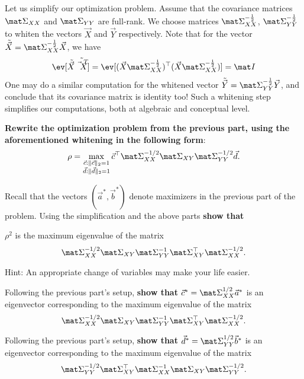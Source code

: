 \documentclass[preview]{standalone}
\begin{document}
\begin{Parts}
\Part Let us simplify our optimization problem. Assume that the covariance matrices
$\mat \Sigma_{XX}$ and $\mat \Sigma_{YY}$ are full-rank.
We choose matrices $\mat \Sigma_{XX}^{-\frac{1}{2}}$,
$\mat \Sigma_{YY}^{-\frac{1}{2}}$ to whiten the vectors $\vec X$ and $\vec Y$ respectively.
Note that for the vector $\tilde{\vec X} = \mat \Sigma_{XX}^{-\frac{1}{2}} \vec X$, we have
\begin{align*}
  \ev[\tilde{\vec X} \tilde{\vec X^T} ]
  = \ev[(\vec X\mat \Sigma_{XX}^{-\frac{1}{2}})^\top(\vec X\mat \Sigma_{XX}^{-\frac{1}{2}})]
  = \mat I
\end{align*}
One may do a similar computation for the whitened vector $\tilde{\vec Y} = \mat \Sigma_{YY}^{-\frac{1}{2}} \vec Y$, and conclude that its covariance matrix is identity too!
Such a whitening step simplifies our computations, both at algebraic and conceptual level.

{\bf Rewrite the optimization problem from the previous part, using the aforementioned
whitening in the following form}:
\begin{align*}
\rho = \max_{\substack{\vec{c} : \|\vec{c}\|_2 = 1 \\ \vec{d}: \|\vec{d}\|_2 = 1 }}
\vec{c}^\top \mat \Sigma_{XX}^{-1/2}\mat \Sigma_{XY} \mat \Sigma_{YY}^{-1/2} \vec{d}.
\end{align*}



\Part Recall that the vectors $(\vec{a}^*, \vec{b}^*)$ denote maximizers in the previous part of the problem.
Using the simplification and the above parts {\bf show that}

$\rho^2$ is the maximum eigenvalue of the matrix
$$\mat \Sigma_{XX}^{-1/2} \mat \Sigma_{XY} \mat \Sigma_{YY}^{-1} \mat \Sigma_{XY}^\top \mat \Sigma_{XX}^{-1/2}.$$

Hint: An appropriate change of variables may make your life easier.



\Part Following the previous part's setup, {\bf show that}
$\vec{c}^* = \mat \Sigma_{XX}^{1/2} \vec{a}^*$ is an eigenvector
corresponding to the maximum eigenvalue of the matrix
$$\mat \Sigma_{XX}^{-1/2} \mat \Sigma_{XY} \mat \Sigma_{YY}^{-1} \mat \Sigma_{XY}^\top \mat \Sigma_{XX}^{-1/2}.$$



\Part Following the previous part's setup, {\bf show that}
$\vec{d}^* = \mat \Sigma_{YY}^{1/2} \vec{b}^*$ is an eigenvector
corresponding to the maximum eigenvalue of the matrix
$$\mat \Sigma_{YY}^{-1/2} \mat \Sigma_{XY}^\top \mat \Sigma_{XX}^{-1} \mat \Sigma_{XY} \mat \Sigma_{YY}^{-1/2}.$$





\end{Parts}
\end{document}
